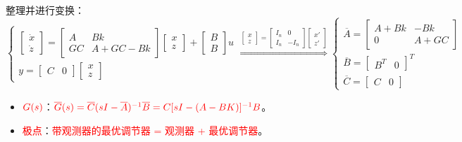 \documentclass[
12pt, %
a4paper, 
oneside, %
]{scrartcl}
\begin{document}
整理并进行变换：
$$
\begin{cases} \begin{bmatrix} \dot{x} \\ \dot{z} \end{bmatrix} = \begin{bmatrix} A & B k \\ G C & A + G C - B k \end{bmatrix} \begin{bmatrix} x \\ z \end{bmatrix} + \begin{bmatrix} B \\ B \end{bmatrix} u \\ y = \begin{bmatrix} C & 0 \end{bmatrix} \begin{bmatrix} x \\ z \end{bmatrix} \end{cases} 
\overset{\begin{bmatrix} x \\ z \end{bmatrix} = \begin{bmatrix} I_n & 0 \\ I_n & -I_n \end{bmatrix} \begin{bmatrix} x' \\ z' \end{bmatrix}}{\Longrightarrow}
\begin{cases} \overline{A} = \begin{bmatrix} A + B k & - B k \\ 0 & A + G C \end{bmatrix} \\ \overline{B} = \begin{bmatrix} B^T & 0 \end{bmatrix}^T \\ \overline{C} = \begin{bmatrix} C & 0 \end{bmatrix} \end{cases} 
$$
\begin{itemize}
\item $ \textcolor{red}{G(s)} $：$ \textcolor{red}{\overline{G}(s) = \overline{C}(s I - \overline{A})^{-1} \overline{B} = C[s I - (A - B K)]^{-1} B} $。
\item \textcolor{red}{极点}：\textcolor{red}{带观测器的最优调节器 = 观测器 + 最优调节器}。
\end{itemize}
\end{document}
